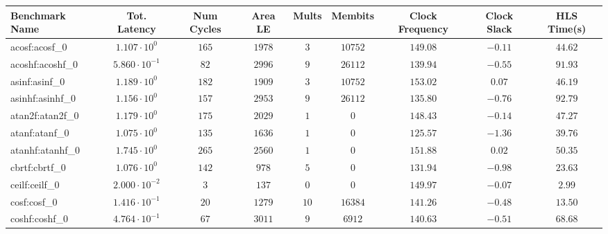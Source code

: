 \begin{tabular}{|l|c|c|c|c|c|c|c|c|}
\hline
Benchmark Name               & Tot. Latency            & Num Cycles & Area LE   & Mults   & Membits    & Clock Frequency & Clock Slack & HLS Time(s) \\
\hline
acosf:acosf\_0               & $ 1.107 \cdot 10^{0}  $ & $ 165    $ & $ 1978  $ & $ 3   $ & $ 10752  $ & $ 149.08      $ & $ -0.11   $ & $ 44.62   $ \\
acoshf:acoshf\_0             & $ 5.860 \cdot 10^{-1} $ & $ 82     $ & $ 2996  $ & $ 9   $ & $ 26112  $ & $ 139.94      $ & $ -0.55   $ & $ 91.93   $ \\
asinf:asinf\_0               & $ 1.189 \cdot 10^{0}  $ & $ 182    $ & $ 1909  $ & $ 3   $ & $ 10752  $ & $ 153.02      $ & $ 0.07    $ & $ 46.19   $ \\
asinhf:asinhf\_0             & $ 1.156 \cdot 10^{0}  $ & $ 157    $ & $ 2953  $ & $ 9   $ & $ 26112  $ & $ 135.80      $ & $ -0.76   $ & $ 92.79   $ \\
atan2f:atan2f\_0             & $ 1.179 \cdot 10^{0}  $ & $ 175    $ & $ 2029  $ & $ 1   $ & $ 0      $ & $ 148.43      $ & $ -0.14   $ & $ 47.27   $ \\
atanf:atanf\_0               & $ 1.075 \cdot 10^{0}  $ & $ 135    $ & $ 1636  $ & $ 1   $ & $ 0      $ & $ 125.57      $ & $ -1.36   $ & $ 39.76   $ \\
atanhf:atanhf\_0             & $ 1.745 \cdot 10^{0}  $ & $ 265    $ & $ 2560  $ & $ 1   $ & $ 0      $ & $ 151.88      $ & $ 0.02    $ & $ 50.35   $ \\
cbrtf:cbrtf\_0               & $ 1.076 \cdot 10^{0}  $ & $ 142    $ & $ 978   $ & $ 5   $ & $ 0      $ & $ 131.94      $ & $ -0.98   $ & $ 23.63   $ \\
ceilf:ceilf\_0               & $ 2.000 \cdot 10^{-2} $ & $ 3      $ & $ 137   $ & $ 0   $ & $ 0      $ & $ 149.97      $ & $ -0.07   $ & $ 2.99    $ \\
cosf:cosf\_0                 & $ 1.416 \cdot 10^{-1} $ & $ 20     $ & $ 1279  $ & $ 10  $ & $ 16384  $ & $ 141.26      $ & $ -0.48   $ & $ 13.50   $ \\
coshf:coshf\_0               & $ 4.764 \cdot 10^{-1} $ & $ 67     $ & $ 3011  $ & $ 9   $ & $ 6912   $ & $ 140.63      $ & $ -0.51   $ & $ 68.68   $ \\

\end{tabular}
